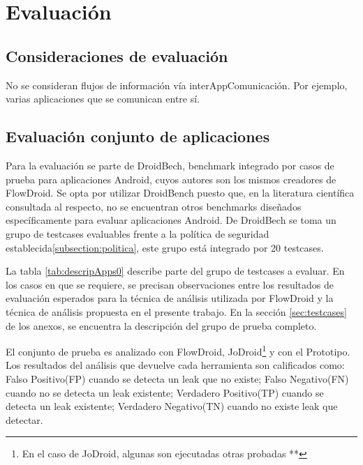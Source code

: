 \label{ch:evaluacion}
\chapter{Evaluación}

\section{Consideraciones de evaluación}
No se consideran flujos de información vía interAppComunicación. Por ejemplo,
varias aplicaciones que se comunican entre sí.

\section{Evaluación conjunto de aplicaciones}
Para la evaluación se parte de DroidBech\cite{DroidBenchBenchmarks}, benchmark
integrado por casos de prueba para aplicaciones Android, cuyos autores son los mismos creadores de
FlowDroid. Se opta por utilizar DroidBench puesto que, en la literatura
científica consultada al respecto, no se encuentran otros benchmarks diseñados
específicamente para evaluar aplicaciones Android.\newline 
De DroidBech se toma un grupo de testcases evaluables frente a la política de
seguridad establecida\ref{subsection:politica}, este grupo está integrado por 20
testcases.

La tabla \ref{tab:descripApps0} describe parte del grupo de testcases a
evaluar. En los casos en que se requiere, se precisan observaciones entre los
resultados de evaluación esperados para la técnica de análisis utilizada por
FlowDroid y la técnica de análisis propuesta en el presente trabajo. En
la sección \ref{sec:testcases} de los anexos, se encuentra la
descripción del grupo de prueba completo.

El conjunto de prueba es analizado con FlowDroid, JoDroid\footnote{En el caso de
JoDroid, algunas son ejecutadas otras probadas **} y con el Prototipo. Los
resultados del análisis que devuelve cada herramienta son calificados como:
Falso Positivo(FP) cuando se detecta un leak que no existe; Falso Negativo(FN)
cuando no se detecta un leak existente; Verdadero Positivo(TP) cuando se detecta
un leak existente; Verdadero Negativo(TN) cuando no existe leak que detectar.

